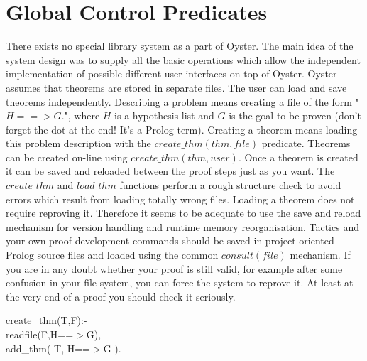 \documentclass[11pt]{report}
\makeatletter
\newcommand{\ulinv}[1]{\index{#1@\texttt{#1}}}
\makeatother
\begin{document}
 
 \section{Global Control Predicates}
 There exists no special library system as a part of Oyster. 
 The main idea of the system design was to supply all the basic
 operations which allow the independent implementation of
 possible different user interfaces on top of Oyster.
 Oyster assumes that theorems are stored
 in separate files. The user can load and save theorems independently. 
 Describing a problem means creating a
 file of the form  "$H==>G.$", where $H$ is a hypothesis list and
 $G$ is the goal to be proven  (don't forget
 the dot at the end! It's a Prolog term). Creating a theorem 
 means loading this problem description with the 
 $create\_thm(thm,file)$ predicate. Theorems can
 be created on-line using $create\_thm(thm,user)$.  Once a theorem 
 is created it can be saved and reloaded between the proof steps
 just as you want. 
 The $create\_thm$ and $load\_thm$ functions perform a rough
 structure check to avoid errors which result from loading totally 
 wrong files. Loading a theorem does not
 require reproving it. Therefore it seems to be adequate to 
 use the save and reload mechanism for version handling and
 runtime memory reorganisation. Tactics and your own proof development
 commands should be saved in project oriented Prolog source files
 and loaded using the common $consult(file)$ mechanism.
 If you are in any doubt whether your proof is still valid,
 for example after some confusion in your file system, you can
 force the system to reprove it.
 At least at the very end of a proof you should check it seriously.
  
 \ulinv{create\_thm}
\begin{sf}\begin{tabbing}
create\_\hspace{0.1em}thm(T,F):-\\[-0.15ex]
\hspace{2em}readfile(F,H==$>$G),\\[-0.15ex]
\hspace{2em}add\_\hspace{0.1em}thm( T, H==$>$G ).
\end{tabbing}\end{sf}
\end{document}
